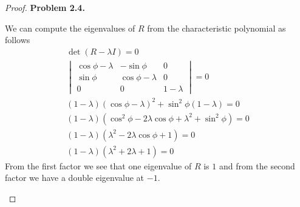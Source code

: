 \documentclass[11pt]{article}
\theoremstyle{definition}
\begin{document}
\begin{proof}{\textbf{Problem 2.4.}}
\begin{itemize}
\begin{itemize}
    We can compute the eigenvalues of $R$ from the characteristic polynomial
    as follows
    \begin{align*}
        \det(R - \lambda I) = 0\\
        \begin{vmatrix}
            \cos\phi - \lambda & -\sin\phi & 0\\
            \sin\phi & \cos\phi - \lambda & 0\\
            0 & 0 & 1 - \lambda
        \end{vmatrix} = 0\\
        (1 - \lambda)(\cos\phi - \lambda)^2 + \sin^2\phi(1- \lambda) = 0\\
        (1 - \lambda)(\cos^2\phi - 2\lambda\cos\phi + \lambda^2 + \sin^2\phi) = 0\\
        (1 - \lambda)(\lambda^2 - 2\lambda\cos\phi + 1) = 0\\
        (1 - \lambda)(\lambda^2 + 2\lambda + 1) = 0
    \end{align*}
    From the first factor we see that one eigenvalue of $R$ is $1$ and from the
    second factor we have a double eigenvalue at $-1$.


\end{itemize}
\end{itemize}
\end{proof}
\end{document}
